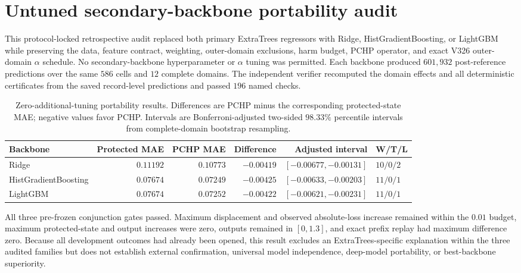 \documentclass[11pt]{article}
\begin{document}
\section{Untuned secondary-backbone portability audit}

This protocol-locked retrospective audit replaced both primary ExtraTrees regressors with Ridge, HistGradientBoosting, or LightGBM while preserving the data, feature contract, weighting, outer-domain exclusions, harm budget, PCHP operator, and exact V326 outer-domain $\alpha$ schedule. No secondary-backbone hyperparameter or $\alpha$ tuning was permitted. Each backbone produced $601{,}932$ post-reference predictions over the same $586$ cells and $12$ complete domains. The independent verifier recomputed the domain effects and all deterministic certificates from the saved record-level predictions and passed $196$ named checks.

\begin{table}[H]
\centering
\caption{Zero-additional-tuning portability results. Differences are PCHP minus the corresponding protected-state MAE; negative values favor PCHP. Intervals are Bonferroni-adjusted two-sided $98.33\%$ percentile intervals from complete-domain bootstrap resampling.}
\label{tab:backbone_portability}
\scriptsize
\begin{tabularx}{\textwidth}{>{\raggedright\arraybackslash}Xrrrrl}
\toprule
Backbone & Protected MAE & PCHP MAE & Difference & Adjusted interval & W/T/L \\
\midrule
Ridge & $0.11192$ & $0.10773$ & $-0.00419$ & $[-0.00677,-0.00131]$ & $10/0/2$ \\
HistGradientBoosting & $0.07674$ & $0.07249$ & $-0.00425$ & $[-0.00633,-0.00203]$ & $11/0/1$ \\
LightGBM & $0.07674$ & $0.07252$ & $-0.00422$ & $[-0.00621,-0.00231]$ & $11/0/1$ \\
\bottomrule
\end{tabularx}
\end{table}

All three pre-frozen conjunction gates passed. Maximum displacement and observed absolute-loss increase remained within the $0.01$ budget, maximum protected-state and output increases were zero, outputs remained in $[0,1.3]$, and exact prefix replay had maximum difference zero. Because all development outcomes had already been opened, this result excludes an ExtraTrees-specific explanation within the three audited families but does not establish external confirmation, universal model independence, deep-model portability, or best-backbone superiority.
\end{document}
